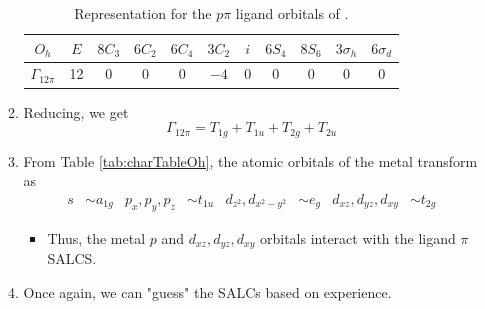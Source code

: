 \documentclass[../notes.tex]{subfiles}
\begin{document}
\begin{itemize}
\begin{enumerate}
\begin{table}[h!]
            \centering
            \small
            \renewcommand{\arraystretch}{1.2}
            \begin{tabular}{c|cccccccccc}
                $O_h$ & $E$ & $8C_3$ & $6C_2$ & $6C_4$ & $3C_2$ & $i$ & $6S_4$ & $8S_6$ & $3\sigma_h$ & $6\sigma_d$\\
                \hline
                $\Gamma_{12\pi}$ & 12 & 0 & 0 & 0 & $-4$ & 0 & 0 & 0 & 0 & 0\\
            \end{tabular}
            \caption{Representation for the $p\pi$ ligand orbitals of .}
            \label{tab:ML6pRR}
        \end{table}
        \item Reducing, we get
        \begin{equation*}
            \Gamma_{12\pi} = T_{1g}+T_{1u}+T_{2g}+T_{2u}
        \end{equation*}
        \item From Table \ref{tab:charTableOh}, the atomic orbitals of the metal transform as
        \begin{align*}
            s &\sim a_{1g}&
            p_x,p_y,p_z &\sim t_{1u}&
            d_{z^2},d_{x^2-y^2} &\sim e_g&
            d_{xz},d_{yz},d_{xy} &\sim t_{2g}
        \end{align*}
        \begin{itemize}
            \item Thus, the metal $p$ and $d_{xz},d_{yz},d_{xy}$ orbitals interact with the ligand $\pi$ SALCS.
        \end{itemize}
        \pagebreak
        \item Once again, we can "guess" the SALCs based on experience.
        \begin{figure}[H]
            \centering
            \begin{subfigure}[b]{0.24\linewidth}
                \centering
\end{subfigure}
\end{figure}
\end{enumerate}
\end{itemize}
\end{document}

